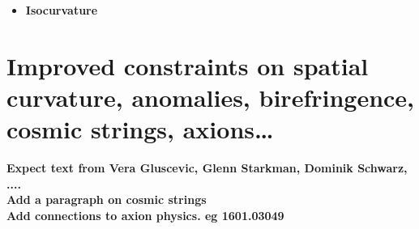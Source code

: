 \begin{itemize}




\item {\bf Isocurvature}
\end{itemize}



\section{Improved constraints on spatial curvature, anomalies, birefringence, cosmic strings, axions\dots}
\label{sec:speculative}
{\bf Expect text from Vera Gluscevic, Glenn Starkman, Dominik Schwarz, ....}\\
{\bf Add a paragraph on cosmic strings}\\
{\bf Add connections to axion physics. eg 1601.03049}


